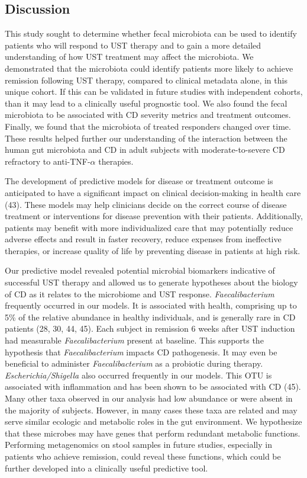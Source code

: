 \documentclass[12pt,]{article}
\begin{document}
\subsection{Discussion}\label{discussion}

This study sought to determine whether fecal microbiota can be used to
identify patients who will respond to UST therapy and to gain a more
detailed understanding of how UST treatment may affect the microbiota.
We demonstrated that the microbiota could identify patients more likely
to achieve remission following UST therapy, compared to clinical
metadata alone, in this unique cohort. If this can be validated in
future studies with independent cohorts, than it may lead to a
clinically useful prognostic tool. We also found the fecal microbiota to
be associated with CD severity metrics and treatment outcomes. Finally,
we found that the microbiota of treated responders changed over time.
These results helped further our understanding of the interaction
between the human gut microbiota and CD in adult subjects with
moderate-to-severe CD refractory to anti-TNF-\({\alpha}\) therapies.

The development of predictive models for disease or treatment outcome is
anticipated to have a significant impact on clinical decision-making in
health care (43). These models may help clinicians decide on the correct
course of disease treatment or interventions for disease prevention with
their patients. Additionally, patients may benefit with more
individualized care that may potentially reduce adverse effects and
result in faster recovery, reduce expenses from ineffective therapies,
or increase quality of life by preventing disease in patients at high
risk.

Our predictive model revealed potential microbial biomarkers indicative
of successful UST therapy and allowed us to generate hypotheses about
the biology of CD as it relates to the microbiome and UST response.
\emph{Faecalibacterium} frequently occurred in our models. It is
associated with health, comprising up to 5\% of the relative abundance
in healthy individuals, and is generally rare in CD patients (28, 30,
44, 45). Each subject in remission 6 weeks after UST induction had
measurable \emph{Faecalibacterium} present at baseline. This supports
the hypothesis that \emph{Faecalibacterium} impacts CD pathogenesis. It
may even be beneficial to administer \emph{Faecalibacterium} as a
probiotic during therapy. \emph{Escherichia/Shigella} also occurred
frequently in our models. This OTU is associated with inflammation and
has been shown to be associated with CD (45). Many other taxa observed
in our analysis had low abundance or were absent in the majority of
subjects. However, in many cases these taxa are related and may serve
similar ecologic and metabolic roles in the gut environment. We
hypothesize that these microbes may have genes that perform redundant
metabolic functions. Performing metagenomics on stool samples in future
studies, especially in patients who achieve remission, could reveal
these functions, which could be further developed into a clinically
useful predictive tool.
\end{document}
